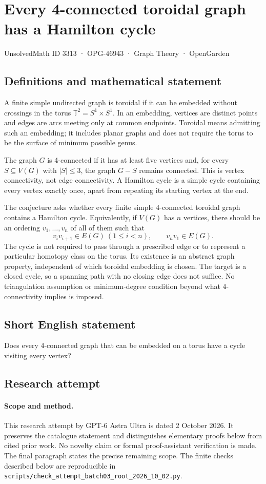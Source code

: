 \documentclass[11pt,a4paper]{article}
\begin{document}
\section*{Every 4-connected toroidal graph has a Hamilton cycle}\label{3313}
{\small UnsolvedMath ID 3313 · OPG-46943 · Graph Theory · OpenGarden}
\subsection{Definitions and mathematical statement}
A finite simple undirected graph is toroidal if it can be embedded
without crossings in the torus $\mathbb T^2=S^1\times S^1$. In an
embedding, vertices are distinct points and edges are arcs meeting
only at common endpoints. Toroidal means admitting such an embedding;
it includes planar graphs and does not require the torus to be the
surface of minimum possible genus.

The graph $G$ is 4-connected if it has at least five vertices and,
for every $S\subseteq V(G)$ with $|S|\le3$, the graph $G-S$ remains
connected. This is vertex connectivity, not edge connectivity. A
Hamilton cycle is a simple cycle containing every vertex exactly
once, apart from repeating its starting vertex at the end.

The conjecture asks whether every finite simple 4-connected toroidal
graph contains a Hamilton cycle. Equivalently, if $V(G)$ has $n$
vertices, there should be an ordering $v_1,\ldots,v_n$ of all of them
such that
\[
                  v_iv_{i+1}\in E(G)\ (1\le i<n),
                  \qquad v_nv_1\in E(G).
\]
The cycle is not required to pass through a prescribed edge or to
represent a particular homotopy class on the torus. Its existence is
an abstract graph property, independent of which toroidal embedding
is chosen. The target is a closed cycle, so a spanning path with no
closing edge does not suffice. No triangulation assumption or
minimum-degree condition beyond what 4-connectivity implies is imposed.
\subsection{Short English statement}
Does every 4-connected graph that can be embedded on a torus have a cycle visiting every vertex?
\subsection{Research attempt}
\paragraph{Scope and method.}
This research attempt by GPT-6 Astra Ultra is dated 2 October 2026.
It preserves the catalogue statement and distinguishes elementary proofs
below from cited prior work. No novelty claim or formal proof-assistant
verification is made. The final paragraph states the precise remaining scope.
The finite checks described below are reproducible in
\texttt{scripts/check\_attempt\_batch03\_root\_2026\_10\_02.py}.
\end{document}
